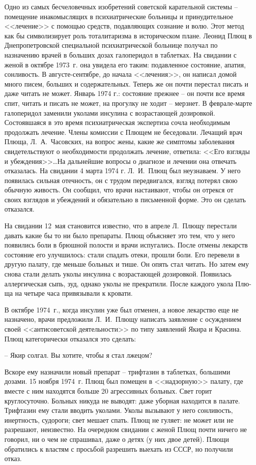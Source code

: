 \documentclass{book}
\begin{document}
Одно из самых бесчеловечных изобретений советской карательной системы -- помещение инакомыслящих в психиатрические больницы и принудительное <<лечение>> с помощью средств, подавляющих сознание и волю. Этот метод как бы символизирует роль тоталитаризма в историческом плане. Леонид Плющ в Днепропетровской специальной психиатрической больнице полу­чал по назначению врачей в больших дозах галоперидол в таблет­ках. На свидании с женой в октябре 1973~г. она увидела его та­ким: подавленное состояние, апатия, сонливость. В августе-сен­тябре, до начала <<лечения>>, он написал домой много писем, боль­ших и содержательных. Теперь же он почти перестал писать и да­же читать не может. Январь 1974 г.: состояние прежнее -- он поч­ти все время спит, читать и писать не может, на прогулку не хо­дит -- мерзнет. В феврале-марте галоперидол заменили уколами инсулина с возрастающей дозировкой. Состоявшаяся в это вре­мя психиатрическая экспертиза сочла необходимым продолжать лечение. Члены комиссии с Плющем не беседовали. Лечащий 
врач 
Плюща, Л.~А.~Часовских, на вопрос жены, какие же симптомы заболевания свидетельствуют о необходимости продолжать лечение, ответила: <<Его взгляды и убеждения>>\ldots На дальнейшие вопросы о диагнозе и лечении она отвечать отказалась.
На свидании 4 марта 1974 г. Л.~И.~Плющ был неузнаваем. У него появилась сильная отечность, он с трудом передвигался, взгляд потерял свою обычную живость. Он сообщил, что врачи настаивают, чтобы он отрекся от своих взглядов и убеж­дений и обязательно в письменной форме. Это он сделать отказался.

На свидании 12~мая становится известно, что в апреле Л.~Плю­щу перестали давать какие бы то ни было препараты. Плющ объясняет это тем, что у него появились боли в брюшной поло­сти и врачи испугались. После отмены лекарств состояние его улучшилось: стали спадать отеки, прошли боли. Его перевели в другую палату, где меньше больных и тише. Он опять стал читать. Но затем ему снова стали делать уколы инсулина с возрастающей дозировкой. Появилась аллергическая сыпь, зуд, однако уколы не прекратили. После каждого укола Плю­ща на четыре часа привязывали к кровати.

В октябре 1974~г., когда инсулин уже был отменен, а но­вое лекарство еще не назначено, врачи предложили Л.~И.~Плю­щу написать заявление с осуждением своей <<антисоветской деятельности>> по типу заявлений Якира и Красина. Плющ кате­горически отказался это сделать:

-- Якир солгал. Вы хотите, чтобы я стал лжецом?

Вскоре ему назначили новый препарат -- трифтазин в таблетках, большими дозами. 15 ноября 1974~г. Плющ был помещен в <<надзорную>> палату, где вместе с ним находятся больше 20 агрессивных больных. Свет горит круглосуточно. Больных никуда не выводят: даже уборная находится в палате. Трифтазин ему стали вводить уколами. Уколы вызывают у него сон­ливость, инертность, судороги; свет мешает спать. Плющ не гуляет: не может или не разрешают, неизвестно. На очередном свидании с женой Плющ почти ничего не говорил, ни о чем не спрашивал, даже о детях (у них двое детей). Плющи обрати­лись к властям с просьбой разрешить выехать из СССР, но получили отказ.
\end{document}
